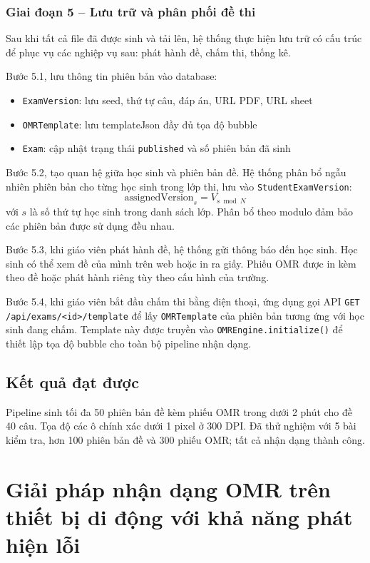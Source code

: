 ﻿\documentclass[../DoAn.tex]{subfiles}
\begin{document}
\subsubsection{Giai đoạn 5 -- Lưu trữ và phân phối đề thi}
Sau khi tất cả file đã được sinh và tải lên, hệ thống thực hiện lưu trữ có cấu trúc để phục vụ các nghiệp vụ sau: phát hành đề, chấm thi, thống kê.

Bước 5.1, lưu thông tin phiên bản vào database:
\begin{itemize}
  \item \texttt{ExamVersion}: lưu seed, thứ tự câu, đáp án, URL PDF, URL sheet
  \item \texttt{OMRTemplate}: lưu templateJson đầy đủ tọa độ bubble
  \item \texttt{Exam}: cập nhật trạng thái \texttt{published} và số phiên bản đã sinh
\end{itemize}

Bước 5.2, tạo quan hệ giữa học sinh và phiên bản đề. Hệ thống phân bổ ngẫu nhiên phiên bản cho từng học sinh trong lớp thi, lưu vào \texttt{StudentExamVersion}:
\begin{equation}
    \text{assignedVersion}_s = V_{s \bmod N}
\end{equation}
với $s$ là số thứ tự học sinh trong danh sách lớp. Phân bổ theo modulo đảm bảo các phiên bản được sử dụng đều nhau.

Bước 5.3, khi giáo viên phát hành đề, hệ thống gửi thông báo đến học sinh. Học sinh có thể xem đề của mình trên web hoặc in ra giấy. Phiếu OMR được in kèm theo đề hoặc phát hành riêng tùy theo cấu hình của trường.

Bước 5.4, khi giáo viên bắt đầu chấm thi bằng điện thoại, ứng dụng gọi API \texttt{GET /api/exams/\textless id\textgreater/template} để lấy \texttt{OMRTemplate} của phiên bản tương ứng với học sinh đang chấm. Template này được truyền vào \texttt{OMREngine.initialize()} để thiết lập tọa độ bubble cho toàn bộ pipeline nhận dạng.

\subsection{Kết quả đạt được}
Pipeline sinh tối đa 50 phiên bản đề kèm phiếu OMR trong dưới 2 phút cho đề 40 câu. Tọa độ các ô chính xác dưới 1 pixel ở 300 DPI. Đã thử nghiệm với 5 bài kiểm tra, hơn 100 phiên bản đề và 300 phiếu OMR; tất cả nhận dạng thành công.

\section{Giải pháp nhận dạng OMR trên thiết bị di động với khả năng phát hiện lỗi}
\label{section:5.2}
\end{document}
